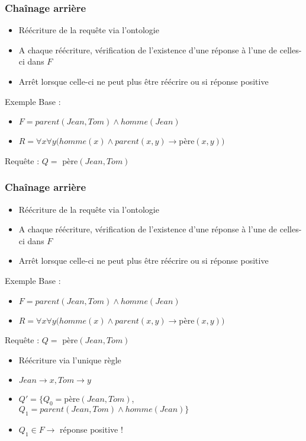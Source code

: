 \begin{frame}[t]
	\frametitle{Chaînage arrière}
	\begin{itemize}
		\item Réécriture de la requête via l'ontologie
		\item A chaque réécriture, vérification de l'existence d'une réponse à l'une de
		celles-ci dans $F$
		\item Arrêt lorsque celle-ci ne peut plus être réécrire ou si réponse positive
	\end{itemize}
	\begin{exampleblock}{Exemple}
	Base :
	\begin{itemize}
		\item $F = parent(Jean,Tom) \wedge homme(Jean)$
		\item $R = \forall x \forall y (homme(x) \wedge parent(x,y) \rightarrow
		$père$(x,y))$
	\end{itemize}
	Requête : $Q = $ père$(Jean,Tom)$\\
	\end{exampleblock}
\end{frame}


\begin{frame}[t]
	\frametitle{Chaînage arrière}
	\begin{itemize}
		\item Réécriture de la requête via l'ontologie
		\item A chaque réécriture, vérification de l'existence d'une réponse à l'une de
		celles-ci dans $F$
		\item Arrêt lorsque celle-ci ne peut plus être réécrire ou si réponse positive
	\end{itemize}
	\begin{exampleblock}{Exemple}
	Base :
	\begin{itemize}
		\item $F = parent(Jean,Tom) \wedge homme(Jean)$
		\item $R = \forall x \forall y (homme(x) \wedge parent(x,y) \rightarrow
		$père$(x,y))$
	\end{itemize}
	Requête : $Q = $ père$(Jean,Tom)$\\
	\begin{itemize}
		\item Réécriture via l'unique règle
		\item $Jean \rightarrow x, Tom \rightarrow y$
		\item $Q' = \{Q_0 = $père$(Jean,Tom)$, $Q_1 = parent(Jean,Tom) \wedge
		homme(Jean) \}$
		\item $Q_1 \in F \rightarrow$ réponse positive !
	\end{itemize}
	\end{exampleblock}
\end{frame}


